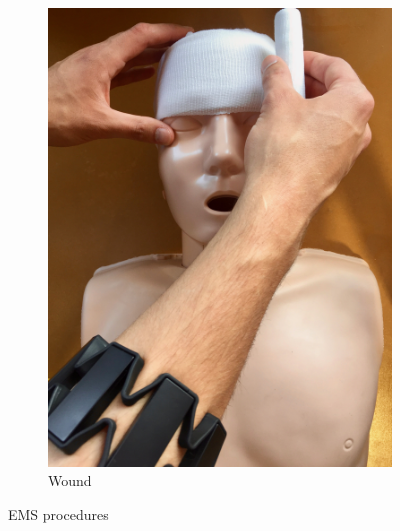 \begin{figure}[b]
\begin{subfigure}[b]{0.18\textwidth}
		\includegraphics[width=\textwidth]{pictures/wound}
		\caption{Wound}
		\label{fig:wound}
	\end{subfigure}
	\caption{EMS procedures}
	\label{fig:EMS-procedures}
\end{figure}
